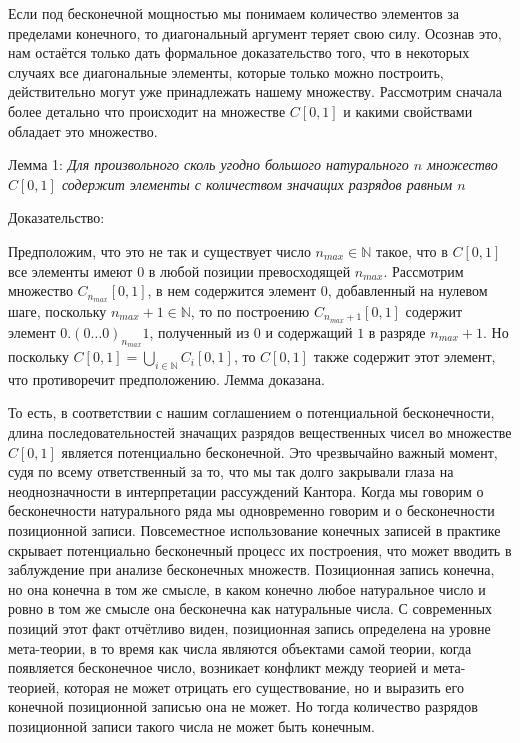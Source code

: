 \documentclass[12pt]{article}
\begin{document}
Если под бесконечной мощностью мы понимаем количество элементов за пределами конечного, то диагональный аргумент теряет свою силу. Осознав это, нам остаётся только дать формальное доказательство того, что в некоторых случаях все диагональные элементы, которые только можно построить, действительно могут уже принадлежать нашему множеству. Рассмотрим сначала более детально что происходит на множестве $C[0, 1]$ и какими свойствами обладает это множество.

Лемма 1: {\sl Для произвольного сколь угодно большого натурального $n$ множество $C[0, 1]$ содержит элементы с количеством значащих разрядов равным $n$}

Доказательство:

Предположим, что это не так и существует число $n_{max} \in \mathbb{N}$ такое, что в $C[0, 1]$ все элементы имеют $0$ в любой позиции превосходящей $n_{max}$. Рассмотрим множество $C_{n_{max}}[0, 1]$, в нем содержится элемент $0$, добавленный на нулевом шаге, поскольку $n_{max} + 1 \in \mathbb{N}$, то по построению $C_{n_{max}+1}[0, 1]$ содержит элемент $0.(0\dots0)_{n_{max}}1$, полученный из $0$ и содержащий $1$ в разряде $n_{max} + 1$. Но поскольку $C[0, 1] = \bigcup\limits_{i \in \mathbb{N}} C_i[0, 1]$, то $C[0, 1]$ также содержит этот элемент, что противоречит предположению. Лемма доказана.

То есть, в соответствии с нашим соглашением о потенциальной бесконечности, длина последовательностей значащих разрядов вещественных чисел во множестве $C[0, 1]$ является потенциально бесконечной. Это чрезвычайно важный момент, судя по всему ответственный за то, что мы так долго закрывали глаза на неоднозначности в интерпретации рассуждений Кантора. Когда мы говорим о бесконечности натурального ряда мы одновременно говорим и о бесконечности позиционной записи. Повсеместное использование конечных записей в практике скрывает потенциально бесконечный процесс их построения, что может вводить в заблуждение при анализе бесконечных множеств. Позиционная запись конечна, но она конечна в том же смысле, в каком конечно любое натуральное число и ровно в том же смысле она бесконечна как натуральные числа. С современных позиций этот факт отчётливо виден, позиционная запись определена на уровне мета-теории, в то время как числа являются объектами самой теории, когда появляется бесконечное число, возникает конфликт между теорией и мета-теорией, которая не может отрицать его существование, но и выразить его конечной позиционной записью она не может. Но тогда количество разрядов позиционной записи такого числа не может быть конечным. 
\end{document}
